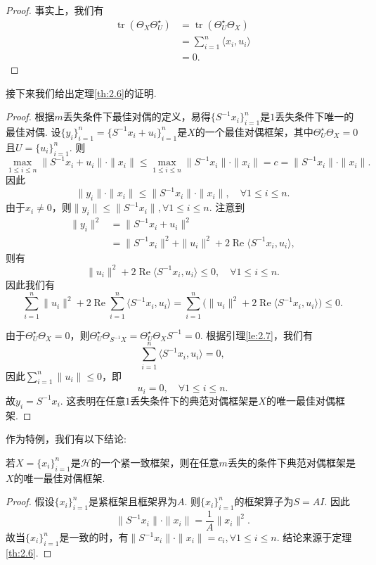 \documentclass[cn,11pt,a4paper,founder]{elegantpaper}
\newcommand{\calH}{\mathcal{H}}
\DeclareMathOperator{\tr}{tr}
\DeclareMathOperator{\RP}{Re}
\begin{document}
\begin{proof}
事实上，我们有
\begin{align*}
\tr(\Theta_X\Theta_U^{\star})&=\tr(\Theta_U^{\star}\Theta_X)\\
&=\sum_{i=1}^n\langle x_i,u_i\rangle\\
&=0.
\end{align*}
\end{proof}

接下来我们给出定理\ref{th:2.6}的证明.

\begin{proof}
根据\(m\)丢失条件下最佳对偶的定义，易得\(\{S^{-1}x_i\}_{i=1}^n\)是\(1\)丢失条件下唯一的最佳对偶. 设\(\{y_i\}_{i=1}^n=\{S^{-1}x_i+u_i\}_{i=1}^n\)是\(X\)的一个最佳对偶框架，其中\(\Theta_U^{\star}\Theta_X=0\)且\(U=\{u_i\}_{i=1}^n\). 则
\[
	\max_{1\leqslant i\leqslant n}\|S^{-1}x_i+u_i\|\cdot\|x_i\|\leqslant\max_{1\leqslant i\leqslant n}\|S^{-1}x_i\|\cdot\|x_i\|=c=\|S^{-1}x_i\|\cdot\|x_i\|.
\]
因此
\[
	\|y_i\|\cdot\|x_i\|\leqslant\|S^{-1}x_i\|\cdot\|x_i\|,\quad\forall 1\leqslant i\leqslant n.
\]
由于\(x_i\ne 0\)，则\(\|y_i\|\leqslant\|S^{-1}x_i\|,\forall 1\leqslant i\leqslant n\). 注意到
\begin{align*}
\|y_i\|^2&=\|S^{-1}x_i+u_i\|^2\\
&=\|S^{-1}x_i\|^2+\|u_i\|^2+2\RP\langle S^{-1}x_i,u_i\rangle,
\end{align*}
则有
\[
	\|u_i\|^2+2\RP\langle S^{-1}x_i,u_i\rangle\leqslant 0,\quad\forall 1\leqslant i\leqslant n.
\]
因此我们有
\[
	\sum_{i=1}^n\|u_i\|^2+2\RP\sum_{i=1}^n\langle S^{-1}x_i,u_i\rangle=\sum_{i=1}^n\Big(\|u_i\|^2+2\RP\langle S^{-1}x_i,u_i\rangle\Big)\leqslant 0.
\]

由于\(\Theta_U^{\star}\Theta_X=0\)，则\(\Theta_U^{\star}\Theta_{S^{-1}X}=\Theta_U^{\star}\Theta_X S^{-1}=0\). 根据引理\ref{le:2.7}，我们有
\[
	\sum_{i=1}^n\langle S^{-1}x_i,u_i\rangle=0,
\]
因此\(\sum_{i=1}^n\|u_i\|\leqslant 0\)，即
\[
	u_i=0,\quad\forall 1\leqslant i\leqslant n.
\]
故\(y_i=S^{-1}x_i\). 这表明在任意\(1\)丢失条件下的典范对偶框架是\(X\)的唯一最佳对偶框架.
\end{proof}

作为特例，我们有以下结论:

\begin{corollary}\label{co:2.8}
若\(X=\{x_i\}_{i=1}^n\)是\(\calH\)的一个紧一致框架，则在任意\(m\)丢失的条件下典范对偶框架是\(X\)的唯一最佳对偶框架.
\end{corollary}

\begin{proof}
假设\(\{x_i\}_{i=1}^n\)是紧框架且框架界为\(A\). 则\(\{x_i\}_{i=1}^n\)的框架算子为\(S=AI\). 因此
\[
	\|S^{-1}x_i\|\cdot\|x_i\|=\frac{1}{A}\|x_i\|^2.
\]
故当\(\{x_i\}_{i=1}^n\)是一致的时，有\(\|S^{-1}x_i\|\cdot\|x_i\|=c_i,\forall 1\leqslant i\leqslant n\). 结论来源于定理\ref{th:2.6}.
\end{proof}
\end{document}
